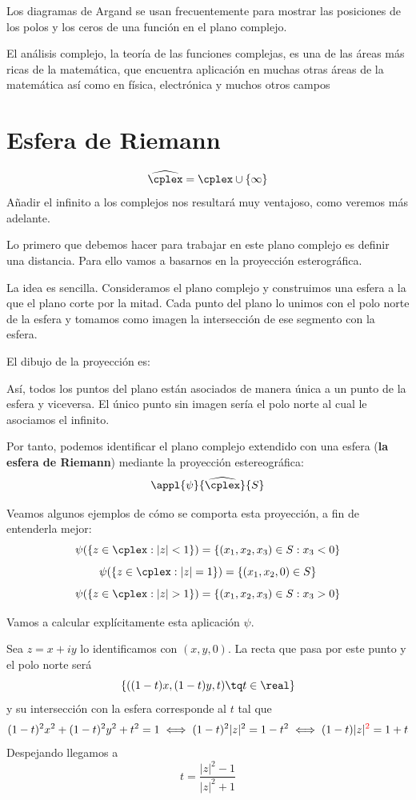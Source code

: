 \documentclass{apuntes}
\begin{document}
Los diagramas de Argand se usan frecuentemente para mostrar las posiciones de los polos y los ceros de una función en el plano complejo.

El análisis complejo, la teoría de las funciones complejas, es una de las áreas más ricas de la matemática, que encuentra aplicación en muchas otras áreas de la matemática así como en física, electrónica y muchos otros campos

\section{Esfera de Riemann}
\begin{defn}
\[\widehat{\cplex}=\cplex \cup \{\infty\}\]
Añadir el infinito a los complejos nos resultará muy ventajoso, como veremos más adelante.
\end{defn}

Lo primero que debemos hacer para trabajar en este plano complejo es definir una distancia. Para ello vamos a basarnos en la proyección esterográfica.

La idea es sencilla. Consideramos el plano complejo y construimos una esfera a la que el plano corte por la mitad. Cada punto del plano lo unimos con el polo norte de la esfera y tomamos como imagen la intersección de ese segmento con la esfera.

El dibujo de la proyección es:



Así, todos los puntos del plano están asociados de manera única a un punto de la esfera y viceversa. El único punto sin imagen sería el polo norte al cual le asociamos el infinito.

Por tanto, podemos identificar el plano complejo extendido con una esfera (\textbf{la esfera de Riemann}) mediante la proyección estereográfica:
\[\appl{\psi}{\widehat{\cplex}}{S}\]

\begin{example}
Veamos algunos ejemplos de cómo se comporta esta proyección, a fin de entenderla mejor:
\[\psi(\{z \in \cplex : |z|<1\})=\{(x_1,x_2,x_3) \in S: x_3<0\}\]
\[\psi(\{z \in \cplex : |z|=1\})=\{(x_1,x_2,0)\in S\}\]
\[\psi(\{z \in \cplex : |z|>1\})=\{(x_1,x_2,x_3) \in S: x_3>0\}\]
\end{example}

Vamos a calcular explícitamente esta aplicación $\psi$.

Sea $z=x+iy$ lo identificamos con $(x,y,0)$. La recta que pasa por este punto y el polo norte será
\[\{((1-t)x, (1-t)y, t) \tq t \in \real\}\]
y su intersección con la esfera corresponde al $t$ tal que
\[(1-t)^2x^2+(1-t)^2y^2+t^2=1 \iff (1-t)^2|z|^2=1-t^2 \iff (1-t)|z|^{\textcolor{red}{2}}=1+t\]
Despejando llegamos a
\[t = \frac{|z|^2-1}{|z|^2+1}\]
\end{document}
